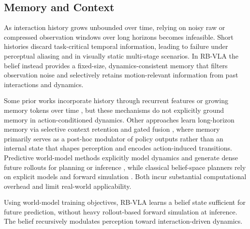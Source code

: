 \documentclass[conference]{IEEEtran}
\begin{document}
\subsection{Memory and Context}
As interaction history grows unbounded over time, relying on noisy raw or compressed observation windows over long horizons becomes infeasible. Short histories discard task-critical temporal information, leading to failure under perceptual aliasing 
and in visually static multi-stage scenarios\cite{spaan2012partially}. In RB-VLA the belief instead provides a fixed-size, dynamics-consistent memory that filters observation noise and selectively retains motion-relevant information from past interactions and dynamics.

Some prior works incorporate history through recurrent features \cite{xiao2025ava} or growing memory tokens over time \cite{koo2025hamlet}, but these mechanisms do not explicitly ground memory in action-conditioned dynamics. Other approaches learn long-horizon memory via selective context retention and gated fusion \cite{liu2025evovla}, where memory primarily serves as a post-hoc modulator of policy outputs rather than an internal state that shapes perception and encodes action-induced transitions. Predictive world-model methods explicitly model dynamics and generate dense future rollouts for planning or inference \cite{cen2025rynnvla, liu2025trivla}, while classical belief-space planners rely on explicit models and forward simulation \cite{kaelbling2013integrated}. Both incur substantial computational overhead and limit real-world applicability.

Using world-model training objectives, RB-VLA learns a belief state sufficient for future prediction, without heavy rollout-based forward simulation at inference. The belief recursively modulates perception toward interaction-driven dynamics. %
\end{document}
